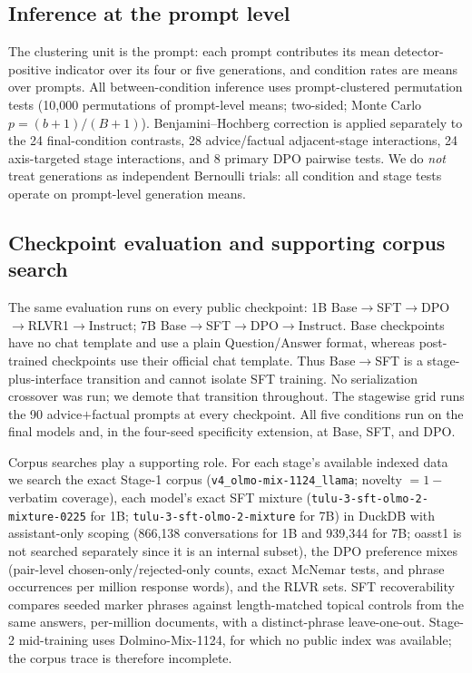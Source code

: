 \documentclass[11pt]{article}
\begin{document}
\subsection{Inference at the prompt level}
\label{sec:method-stats}
The clustering unit is the prompt: each prompt contributes its mean
detector-positive indicator over its four or five generations, and condition rates are means over
prompts. All between-condition inference uses prompt-clustered permutation
tests (10{,}000 permutations of prompt-level means; two-sided;
Monte Carlo $p=(b+1)/(B+1)$). Benjamini--Hochberg correction is applied
separately to the 24 final-condition contrasts, 28 advice/factual adjacent-stage
interactions, 24 axis-targeted stage interactions, and 8 primary DPO pairwise tests.
We do \emph{not} treat generations as independent Bernoulli trials:
all condition and stage tests operate on prompt-level generation means.

\subsection{Checkpoint evaluation and supporting corpus search}
\label{sec:method-stagewise}
The same evaluation runs on every public checkpoint: 1B
Base$\to$SFT$\to$DPO$\to$RLVR1$\to$Instruct; 7B
Base$\to$SFT$\to$DPO$\to$Instruct. Base checkpoints have no chat template and
use a plain Question/Answer format, whereas post-trained checkpoints use their
official chat template. Thus Base$\to$SFT is a stage-plus-interface
transition and cannot isolate SFT training. No serialization crossover was run;
we demote that transition throughout. The
stagewise grid runs the 90 advice$+$factual prompts at every checkpoint. All five
conditions run on the final models and, in the four-seed specificity extension,
at Base, SFT, and DPO.

Corpus searches play a supporting role. For each stage's available indexed data
we search the exact Stage-1 corpus
(\texttt{v4\_olmo-mix-1124\_llama}; novelty $=1-$verbatim coverage), each
model's exact SFT mixture (\texttt{tulu-3-sft-olmo-2-mixture-0225} for 1B;
\texttt{tulu-3-sft-olmo-2-mixture} for 7B) in DuckDB with assistant-only scoping
(866{,}138 conversations for 1B and 939{,}344 for 7B; oasst1 is not searched
separately since it is an internal subset), the DPO preference mixes
(pair-level chosen-only/rejected-only counts, exact McNemar tests, and phrase
occurrences per million response words), and the
RLVR sets. SFT recoverability compares seeded marker phrases against
length-matched topical controls from the same answers, per-million documents,
with a distinct-phrase leave-one-out. Stage-2 mid-training uses
Dolmino-Mix-1124, for which no public index was available; the corpus trace is
therefore incomplete.
\end{document}
